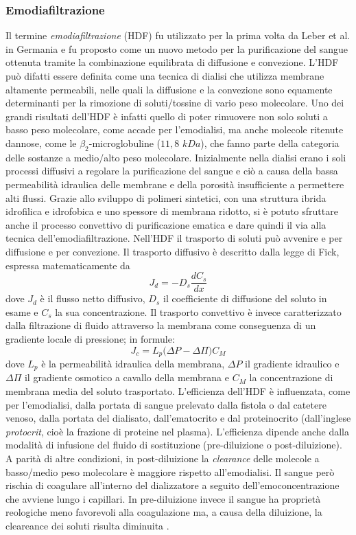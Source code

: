 \subsubsection{Emodiafiltrazione}
Il termine \textit{emodiafiltrazione} (HDF) fu utilizzato per la prima volta da Leber et al. \cite{leber} in Germania e fu proposto come un nuovo metodo per la purificazione del sangue ottenuta tramite la combinazione equilibrata di diffusione e convezione.
L'HDF può difatti essere definita come una tecnica di dialisi che utilizza membrane altamente permeabili, nelle quali la diffusione e la convezione sono equamente determinanti per la rimozione di soluti/tossine di vario peso molecolare.
Uno dei grandi risultati dell'HDF è infatti quello di poter rimuovere non solo soluti a basso peso molecolare, come accade per l'emodialisi, ma anche molecole ritenute dannose, come le $\beta_2$-microglobuline ($11,8$ $kDa$), che fanno parte della categoria delle sostanze a medio/alto peso molecolare.
Inizialmente nella dialisi erano i soli processi diffusivi a regolare la purificazione del sangue e ciò a causa della bassa permeabilità idraulica delle membrane e della porosità insufficiente a permettere alti flussi. Grazie allo sviluppo di polimeri sintetici, con una struttura ibrida idrofilica e idrofobica e uno spessore di membrana ridotto, si è potuto sfruttare anche il processo convettivo di purificazione ematica e dare quindi il via alla tecnica dell'emodiafiltrazione.
Nell'HDF  il trasporto di soluti può avvenire e per diffusione e per convezione. Il trasporto diffusivo è descritto dalla legge di Fick, espressa matematicamente da $$J_d = -D_s \frac{dC_s}{dx}$$
dove $J_d$ è il flusso netto diffusivo, $D_s$ il coefficiente di diffusione del soluto in esame e $C_s$ la sua concentrazione.
Il trasporto convettivo è invece caratterizzato dalla filtrazione di fluido attraverso la membrana come conseguenza di un gradiente locale di pressione; in formule:
$$J_c = L_p \biggl(\Delta P - \Delta\Pi\biggr)C_M$$
dove $L_p$ è la permeabilità idraulica della membrana, $\Delta P$ il gradiente idraulico e $\Delta \Pi$ il gradiente osmotico a cavallo della membrana e  $C_M$ la concentrazione di membrana media del soluto trasportato.
L'efficienza dell'HDF è influenzata, come per l'emodialisi, dalla portata di sangue prelevato dalla fistola o dal catetere venoso, dalla portata del dialisato, dall'ematocrito e dal proteinocrito (dall'inglese \textit{protocrit}, cioè la frazione di proteine nel plasma). L'efficienza dipende anche dalla modalità di infusione del fluido di sostituzione (pre-diluizione o post-diluizione). A parità di altre condizioni, in post-diluizione la \textit{clearance} delle molecole a basso/medio peso molecolare è maggiore rispetto all'emodialisi. Il sangue però rischia di coagulare all'interno del dializzatore a seguito dell'emoconcentrazione che avviene lungo i capillari. In pre-diluizione invece il sangue ha proprietà reologiche meno favorevoli alla coagulazione ma, a causa della diluizione, la cleareance dei soluti risulta diminuita \cite{hoenich}.

